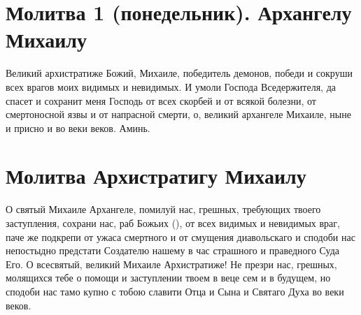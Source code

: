

\label{_content_angelam-molitvi}

 


 
\section{Молитва 1 (понедельник). Архангелу Михаилу}\begin{mymulticols}


Великий архистратиже Божий, Михаиле, победитель демонов, победи и сокруши всех врагов моих видимых и невидимых. И умоли Господа Вседержителя, да спасет и сохранит меня Господь от всех скорбей и от всякой болезни, от смертоносной язвы и от напрасной смерти, о, великий архангеле Михаиле, ныне и присно и во веки веков. Аминь.


\end{mymulticols}

\section{Молитва Архистратигу Михаилу}\begin{mymulticols}
 


О святый Михаиле Архангеле, помилуй нас, грешных, требующих твоего заступления, сохрани нас, раб Божьих (), от всех видимых и невидимых враг, паче же подкрепи от ужаса смертного и от смущения диавольскаго и сподоби нас непостыдно предстати Создателю нашему в час страшного и праведного Суда Его. О всесвятый, великий Михаиле Архистратиже! Не презри нас, грешных, молящихся тебе о помощи и заступлении твоем в веце сем и в будущем, но сподоби нас тамо купно с тобою славити Отца и Сына и Святаго Духа во веки веков.

\end{mymulticols}

\mychapterending



 

